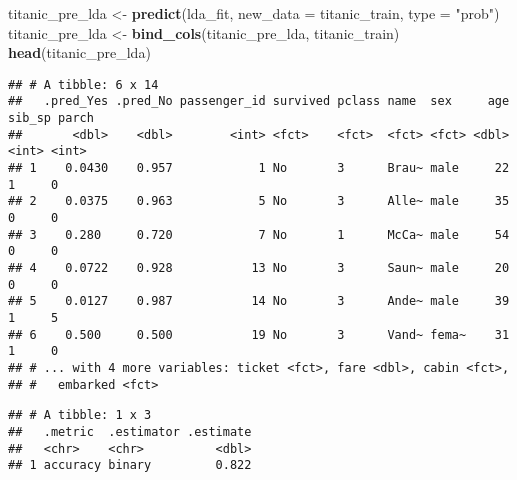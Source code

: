 \documentclass[]{article}
\newenvironment{Shaded}{\begin{snugshade}}{\end{snugshade}}
\newcommand{\DataTypeTok}[1]{\textcolor[rgb]{0.13,0.29,0.53}{#1}}
\newcommand{\KeywordTok}[1]{\textcolor[rgb]{0.13,0.29,0.53}{\textbf{#1}}}
\newcommand{\NormalTok}[1]{#1}
\newcommand{\OperatorTok}[1]{\textcolor[rgb]{0.81,0.36,0.00}{\textbf{#1}}}
\newcommand{\StringTok}[1]{\textcolor[rgb]{0.31,0.60,0.02}{#1}}
\begin{document}
\begin{Shaded}
\begin{Highlighting}[]
\NormalTok{titanic_pre_lda <-}\StringTok{ }\KeywordTok{predict}\NormalTok{(lda_fit, }\DataTypeTok{new_data =}\NormalTok{ titanic_train, }\DataTypeTok{type =} \StringTok{"prob"}\NormalTok{)}
\NormalTok{titanic_pre_lda <-}\StringTok{ }\KeywordTok{bind_cols}\NormalTok{(titanic_pre_lda, titanic_train)}
\KeywordTok{head}\NormalTok{(titanic_pre_lda)}
\end{Highlighting}
\end{Shaded}

\begin{verbatim}
## # A tibble: 6 x 14
##   .pred_Yes .pred_No passenger_id survived pclass name  sex     age sib_sp parch
##       <dbl>    <dbl>        <int> <fct>    <fct>  <fct> <fct> <dbl>  <int> <int>
## 1    0.0430    0.957            1 No       3      Brau~ male     22      1     0
## 2    0.0375    0.963            5 No       3      Alle~ male     35      0     0
## 3    0.280     0.720            7 No       1      McCa~ male     54      0     0
## 4    0.0722    0.928           13 No       3      Saun~ male     20      0     0
## 5    0.0127    0.987           14 No       3      Ande~ male     39      1     5
## 6    0.500     0.500           19 No       3      Vand~ fema~    31      1     0
## # ... with 4 more variables: ticket <fct>, fare <dbl>, cabin <fct>,
## #   embarked <fct>
\end{verbatim}

\begin{Shaded}
\end{Shaded}

\begin{verbatim}
## # A tibble: 1 x 3
##   .metric  .estimator .estimate
##   <chr>    <chr>          <dbl>
## 1 accuracy binary         0.822
\end{verbatim}

\begin{Shaded}
\end{Shaded}
\end{document}
